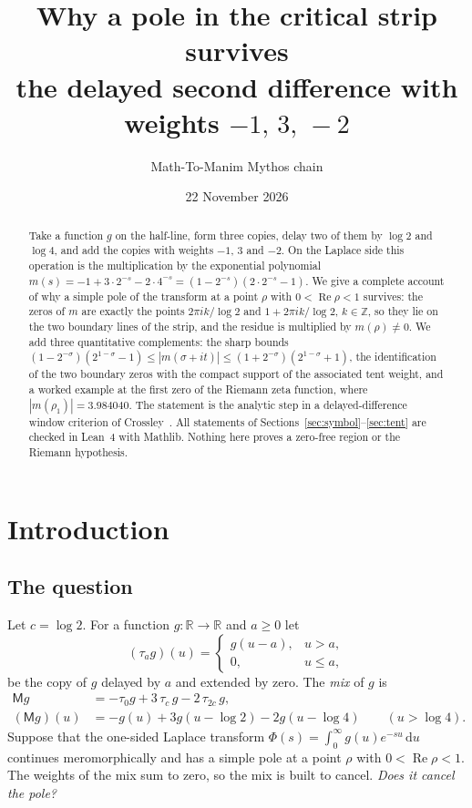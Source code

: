 \documentclass[11pt]{amsart}
\title[A pole in the critical strip survives the mix $-1,3,-2$]{Why a pole in the critical strip survives\\ the delayed second difference with weights $-1,\,3,\,-2$}
\author{Math-To-Manim Mythos chain}
\date{22 November 2026}
\theoremstyle{definition}
\theoremstyle{remark}
\DeclareMathOperator{\re}{Re}
\newcommand{\R}{\mathbb{R}}
\newcommand{\Z}{\mathbb{Z}}
\newcommand{\M}{\mathsf{M}}
\newcommand{\dd}{\,\mathrm{d}}
\begin{document}
\begin{abstract}
Take a function $g$ on the half-line, form three copies, delay two of them by $\log 2$ and $\log 4$,
and add the copies with weights $-1$, $3$ and $-2$. On the Laplace side this operation is the
multiplication by the exponential polynomial $m(s)=-1+3\cdot 2^{-s}-2\cdot 4^{-s}
=(1-2^{-s})(2\cdot 2^{-s}-1)$. We give a complete account of why a simple pole of the
transform at a point $\rho$ with $0<\re\rho<1$ survives: the zeros of $m$ are exactly the points
$2\pi i k/\log 2$ and $1+2\pi i k/\log 2$, $k\in\Z$, so they lie on the two boundary lines of the
strip, and the residue is multiplied by $m(\rho)\neq 0$. We add three quantitative complements: the
sharp bounds $(1-2^{-\sigma})(2^{1-\sigma}-1)\le |m(\sigma+it)|\le(1+2^{-\sigma})(2^{1-\sigma}+1)$,
the identification of the two boundary zeros with the compact support of the associated tent weight,
and a worked example at the first zero of the Riemann zeta function, where $|m(\rho_1)|=3.984040$.
The statement is the analytic step in a delayed-difference window criterion of
Crossley~\cite{Crossley-transfer}. All statements of Sections~\ref{sec:symbol}--\ref{sec:tent}
are checked in Lean~4 with Mathlib. Nothing here proves a zero-free region or the Riemann hypothesis.
\end{abstract}

\maketitle

\section{Introduction}

\subsection{The question}
Let $c=\log 2$. For a function $g\colon\R\to\R$ and $a\ge 0$ let
\[
(\tau_a g)(u)=\begin{cases} g(u-a), & u>a,\\ 0, & u\le a,\end{cases}
\]
be the copy of $g$ delayed by $a$ and extended by zero. The \emph{mix} of $g$ is
\begin{equation}\label{eq:mix}
\begin{aligned}
\M g&=-\tau_0 g+3\,\tau_{c}\,g-2\,\tau_{2c}\,g,\\
(\M g)(u)&=-g(u)+3g(u-\log 2)-2g(u-\log 4)\qquad (u>\log 4).
\end{aligned}
\end{equation}
Suppose that the one-sided Laplace transform $\Phi(s)=\int_0^\infty g(u)e^{-su}\dd u$ continues
meromorphically and has a simple pole at a point $\rho$ with $0<\re\rho<1$. The weights of the mix
sum to zero, so the mix is built to cancel. \emph{Does it cancel the pole?}
\end{document}

